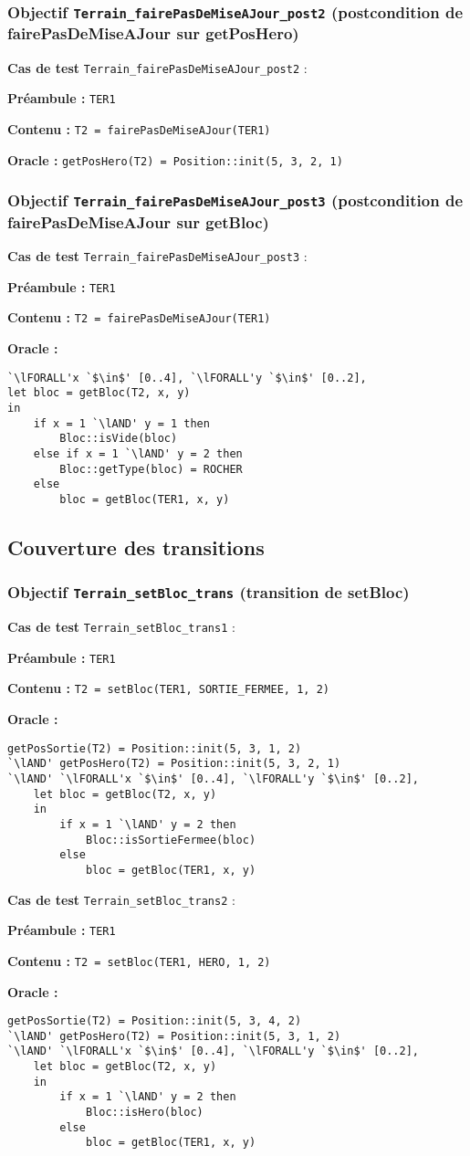 \documentclass{article}
\newcommand{\cmd}[1]{\texttt{#1}}
\newcommand{\lAND}{$\land$}
\newcommand{\lFORALL}{$\forall$}
\newcommand{\obj}[2]{\subsubsection*{\large{\textbf{Objectif {\cmd{#1} (#2)}}}}}
\newenvironment{cas}[1]
{
	\hspace{1em}\textbf{Cas de test} \cmd{#1} :
	\begin{list}{}{}
}{
	\end{list}\vspace{1em}
}
\newcommand{\pre}[1]{\item \textbf{Préambule :} \cmd{#1}}
\newcommand{\ope}[1]{\item \textbf{Contenu :} \cmd{#1}}
\newcommand{\ora}[1]{\item \textbf{Oracle :} \cmd{#1}}
\newcommand{\oram}{\item \textbf{Oracle :}}
\begin{document}
\obj{Terrain\_fairePasDeMiseAJour\_post2} {postcondition de fairePasDeMiseAJour sur getPosHero}
	\begin{cas} {Terrain\_fairePasDeMiseAJour\_post2}
		\pre{TER1}
		\ope{T2 = fairePasDeMiseAJour(TER1)}
		\ora{getPosHero(T2) = Position::init(5, 3, 2, 1)}
	\end{cas}

\obj{Terrain\_fairePasDeMiseAJour\_post3} {postcondition de fairePasDeMiseAJour sur getBloc}
	\begin{cas} {Terrain\_fairePasDeMiseAJour\_post3}
		\pre{TER1}
		\ope{T2 = fairePasDeMiseAJour(TER1)}
		\oram{}
		\begin{lstlisting}
`\lFORALL'x `$\in$' [0..4], `\lFORALL'y `$\in$' [0..2],
let bloc = getBloc(T2, x, y)
in
	if x = 1 `\lAND' y = 1 then
		Bloc::isVide(bloc)
	else if x = 1 `\lAND' y = 2 then
		Bloc::getType(bloc) = ROCHER
	else
		bloc = getBloc(TER1, x, y)
		\end{lstlisting}
	\end{cas}


\subsection{Couverture des transitions}

\obj{Terrain\_setBloc\_trans} {transition de setBloc}
	\begin{cas} {Terrain\_setBloc\_trans1}
		\pre{TER1}
		\ope{T2 = setBloc(TER1, SORTIE\_FERMEE, 1, 2)}
		\oram{}
		\begin{lstlisting}
getPosSortie(T2) = Position::init(5, 3, 1, 2)
`\lAND' getPosHero(T2) = Position::init(5, 3, 2, 1)
`\lAND' `\lFORALL'x `$\in$' [0..4], `\lFORALL'y `$\in$' [0..2],
	let bloc = getBloc(T2, x, y)
	in
		if x = 1 `\lAND' y = 2 then
			Bloc::isSortieFermee(bloc)
		else
			bloc = getBloc(TER1, x, y)
		\end{lstlisting}
	\end{cas}

	\begin{cas} {Terrain\_setBloc\_trans2}
		\pre{TER1}
		\ope{T2 = setBloc(TER1, HERO, 1, 2)}
		\oram{}
		\begin{lstlisting}
getPosSortie(T2) = Position::init(5, 3, 4, 2)
`\lAND' getPosHero(T2) = Position::init(5, 3, 1, 2)
`\lAND' `\lFORALL'x `$\in$' [0..4], `\lFORALL'y `$\in$' [0..2],
	let bloc = getBloc(T2, x, y)
	in
		if x = 1 `\lAND' y = 2 then
			Bloc::isHero(bloc)
		else
			bloc = getBloc(TER1, x, y)
		\end{lstlisting}
	\end{cas}
\end{document}
